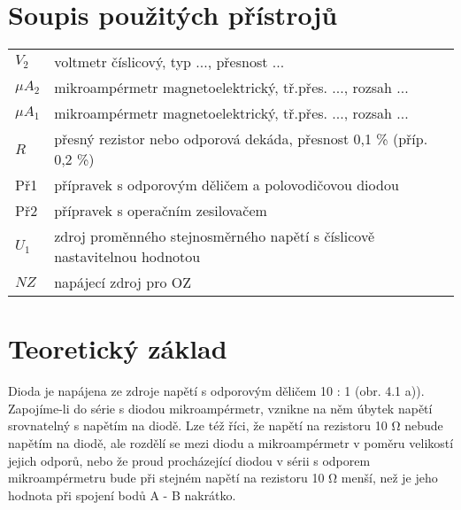 \documentclass{article}
\begin{document}
	\section{Soupis použitých přístrojů}
	\begin{tabular}{ll}
		$V_2$ & voltmetr číslicový, typ ..., přesnost ...  \\
		$\mu A_2$ & mikroampérmetr magnetoelektrický, tř.přes. ..., rozsah ...  \\
		$\mu A_1$ & mikroampérmetr magnetoelektrický, tř.přes. ..., rozsah ...  \\
		$R$ & přesný rezistor nebo odporová dekáda, přesnost 0,1 \% (příp. 0,2 \%)  \\
		Př1 & přípravek s odporovým děličem a polovodičovou diodou \\
		Př2 & přípravek s operačním zesilovačem \\
		$U_1$ & zdroj proměnného stejnosměrného napětí s číslicově nastavitelnou hodnotou  \\
		$NZ$ & napájecí zdroj pro OZ  \\
	\end{tabular}
	\section{Teoretický základ}
	Dioda je napájena ze zdroje napětí s odporovým děličem 10 : 1 (obr. 4.1 a)). Zapojíme-li do série s diodou mikroampérmetr, vznikne na něm úbytek napětí srovnatelný s napětím na diodě. Lze též říci, že napětí na rezistoru 10 \si{\ohm} nebude napětím na 	diodě, ale rozdělí se mezi diodu a mikroampérmetr v poměru velikostí jejich odporů, nebo že 	proud  procházející  diodou  v  sérii  s  odporem mikroampérmetru  bude  při  stejném  napětí  na rezistoru 10 \si{\ohm} menší, než je jeho hodnota při spojení bodů A - B nakrátko.
	
\end{document}
